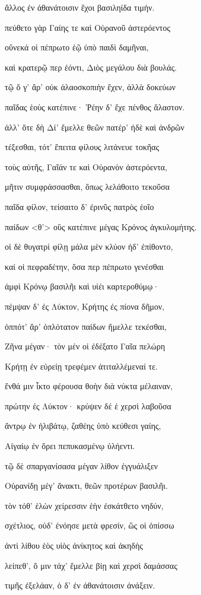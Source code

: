 \begin{pages}
\begin{Leftside}
ἄλλος ἐν ἀθανάτοισιν ἔχοι βασιληίδα τιμήν.

πεύθετο γὰρ Γαίης τε καὶ Οὐρανοῦ ἀστερόεντος 

οὕνεκά οἱ πέπρωτο ἑῷ ὑπὸ παιδὶ δαμῆναι, 

καὶ κρατερῷ περ ἐόντι, Διὸς μεγάλου διὰ βουλάς.  

τῷ ὅ γ' ἄρ' οὐκ ἀλαοσκοπιὴν ἔχεν, ἀλλὰ δοκεύων 

παῖδας ἑοὺς κατέπινε· Ῥέην δ' ἔχε πένθος ἄλαστον. 

ἀλλ' ὅτε δὴ Δί' ἔμελλε θεῶν πατέρ' ἠδὲ καὶ ἀνδρῶν

τέξεσθαι, τότ' ἔπειτα φίλους λιτάνευε τοκῆας

τοὺς αὐτῆς, Γαῖάν τε καὶ Οὐρανὸν ἀστερόεντα, 

μῆτιν συμφράσσασθαι, ὅπως λελάθοιτο τεκοῦσα

παῖδα φίλον, τείσαιτο δ' ἐρινῦς πατρὸς ἑοῖο 

παίδων \textless{}θ'\textgreater{} οὓς κατέπινε μέγας Κρόνος
ἀγκυλομήτης. 

οἱ δὲ θυγατρὶ φίλῃ μάλα μὲν κλύον ἠδ' ἐπίθοντο, 

καί οἱ πεφραδέτην, ὅσα περ πέπρωτο γενέσθαι 

ἀμφὶ Κρόνῳ βασιλῆι καὶ υἱέι καρτεροθύμῳ· 

πέμψαν δ' ἐς Λύκτον, Κρήτης ἐς πίονα δῆμον,

ὁππότ' ἄρ' ὁπλότατον παίδων ἤμελλε τεκέσθαι, 

Ζῆνα μέγαν· τὸν μέν οἱ ἐδέξατο Γαῖα πελώρη 

Κρήτῃ ἐν εὐρείῃ τρεφέμεν ἀτιταλλέμεναί τε.  

ἔνθά μιν ἷκτο φέρουσα θοὴν διὰ νύκτα μέλαιναν, 

πρώτην ἐς Λύκτον· κρύψεν δέ ἑ χερσὶ λαβοῦσα 

ἄντρῳ ἐν ἠλιβάτῳ, ζαθέης ὑπὸ κεύθεσι γαίης,

Αἰγαίῳ ἐν ὄρει πεπυκασμένῳ ὑλήεντι.

τῷ δὲ σπαργανίσασα μέγαν λίθον ἐγγυάλιξεν 

Οὐρανίδῃ μέγ' ἄνακτι, θεῶν προτέρων βασιλῆι.

τὸν τόθ' ἑλὼν χείρεσσιν ἑὴν ἐσκάτθετο νηδύν, 

σχέτλιος, οὐδ' ἐνόησε μετὰ φρεσίν, ὥς οἱ ὀπίσσω 

ἀντὶ λίθου ἑὸς υἱὸς ἀνίκητος καὶ ἀκηδὴς

λείπεθ', ὅ μιν τάχ' ἔμελλε βίῃ καὶ χερσὶ δαμάσσας 

τιμῆς ἐξελάαν, ὁ δ' ἐν ἀθανάτοισιν ἀνάξειν. 


\end{Leftside}
\end{pages}
